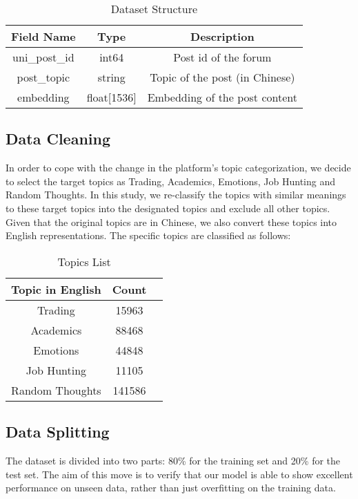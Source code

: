 \documentclass[a4paper, twocolumn]{article}
\begin{document}
\begin{table}[H]
\centering
\footnotesize
\begin{tabular}{|c|c|c|}
\hline
\textbf{Field Name} & \textbf{Type} & \textbf{Description} \\ \hline
uni\_post\_id & int64 & Post id of the forum\\ \hline
post\_topic & string & Topic of the post (in Chinese) \\ \hline
embedding & float[1536] & Embedding of the post content \\ \hline
\end{tabular}
\caption{Dataset Structure}
\end{table}

\subsection{Data Cleaning}

In order to cope with the change in the platform's topic categorization, we decide to select the target topics as Trading, Academics, Emotions, Job Hunting and Random Thoughts. In this study, we re-classify the topics with similar meanings to these target topics into the designated topics and exclude all other topics. Given that the original topics are in Chinese, we also convert these topics into English representations. The specific topics are classified as follows: 

\begin{table}[H]
\centering
\begin{tabular}{|c|c|c|}
\hline
\textbf{Topic in English} & \textbf{Count} \\ \hline
Trading & 15963 \\ \hline
Academics & 88468 \\ \hline
Emotions & 44848\\ \hline
Job Hunting & 11105 \\ \hline
Random Thoughts & 141586 \\ \hline
\end{tabular}
\caption{Topics List}
\end{table}

\subsection{Data Splitting}

The dataset is divided into two parts: 80\% for the training set and 20\% for the test set. The aim of this move is to verify that our model is able to show excellent performance on unseen data, rather than just overfitting on the training data. 
\end{document}
